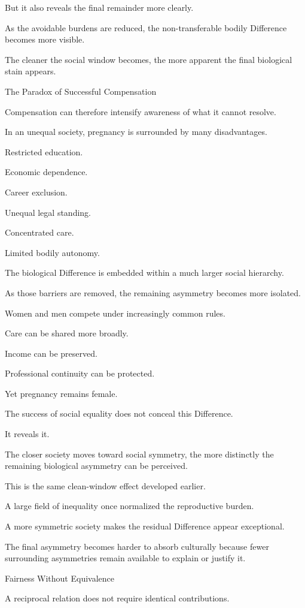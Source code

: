 But it also reveals the final remainder more clearly.

As the avoidable burdens are reduced, the non-transferable bodily Difference becomes more visible.

The cleaner the social window becomes, the more apparent the final biological stain appears.

The Paradox of Successful Compensation

Compensation can therefore intensify awareness of what it cannot resolve.

In an unequal society, pregnancy is surrounded by many disadvantages.

Restricted education.

Economic dependence.

Career exclusion.

Unequal legal standing.

Concentrated care.

Limited bodily autonomy.

The biological Difference is embedded within a much larger social hierarchy.

As those barriers are removed, the remaining asymmetry becomes more isolated.

Women and men compete under increasingly common rules.

Care can be shared more broadly.

Income can be preserved.

Professional continuity can be protected.

Yet pregnancy remains female.

The success of social equality does not conceal this Difference.

It reveals it.

The closer society moves toward social symmetry, the more distinctly the remaining biological asymmetry can be perceived.

This is the same clean-window effect developed earlier.

A large field of inequality once normalized the reproductive burden.

A more symmetric society makes the residual Difference appear exceptional.

The final asymmetry becomes harder to absorb culturally because fewer surrounding asymmetries remain available to explain or justify it.

Fairness Without Equivalence

A reciprocal relation does not require identical contributions.

